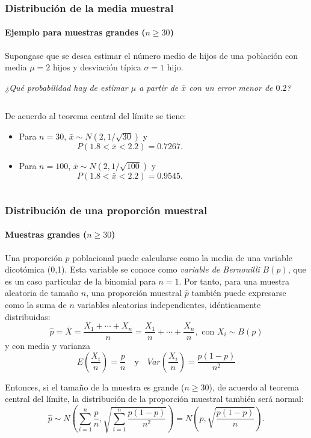 \begin{frame}
\frametitle{Distribución de la media muestral}
\framesubtitle{Ejemplo para muestras grandes ($n\geq 30$)}
Supongase que se desea estimar el número medio de hijos de una población con media $\mu=2$ hijos y desviación típica $\sigma=1$ hijo.
\begin{center}
\emph{¿Qué probabilidad hay de estimar $\mu$ a partir de $\bar x$ con un error menor de $0.2$?}
\end{center}
\begin{columns}
\begin{column}{0.4\textwidth}
De acuerdo al teorema central del límite se tiene:
\begin{itemize}
\item Para $n=30$, $\bar x\sim N(2,1/\sqrt{30})$ y
\[
P(1.8<\bar x<2.2) = 0.7267.
\]

\item Para $n=100$, $\bar x\sim N(2,1/\sqrt{100})$ y
\[
P(1.8<\bar x<2.2) = 0.9545.
\]
\end{itemize}
\end{column}
\begin{column}{0.6\textwidth}
\begin{center}
\scalebox{0.6}{}
\end{center}
\end{column}
\end{columns}
\end{frame}


\begin{frame}
\frametitle{Distribución de una proporción muestral}
\framesubtitle{Muestras grandes ($n\geq 30$)}
Una proporción $p$ poblacional puede calcularse como la media de una variable dicotómica (0,1). 
Esta variable se conoce como \emph{variable de Bernouilli} $B(p)$, que es un caso particular de la binomial para $n=1$.
Por tanto, para una muestra aleatoria de tamaño $n$, una proporción muestral $\hat p$ también puede expresarse como la suma de $n$ variables aleatorias independientes, idénticamente distribuidas:
\[
\hat p = \bar X = \frac{X_1+\cdots+X_n}{n} = \frac{X_1}{n}+\cdots+\frac{X_n}{n}, \mbox{ con } X_i\sim B(p)
\]
y con media y varianza
\[
E\left(\frac{X_i}{n}\right) =\frac{p}{n} \quad  \mbox{y} \quad Var\left(\frac{X_i}{n}\right) = \frac{p(1-p)}{n^2}
\]

Entonces, si el tamaño de la muestra es grande ($n\geq 30$), de acuerdo al teorema central del límite, la distribución de la proporción muestral también será normal:
\[
\hat p \sim N\left(\sum_{i=1}^n \frac{p}{n},\sqrt{\sum_{i=1}^n \frac{p(1-p)}{n^2}} \right) = N\left(p,\sqrt{\frac{p(1-p)}{n}} \right).
\]
\end{frame}


